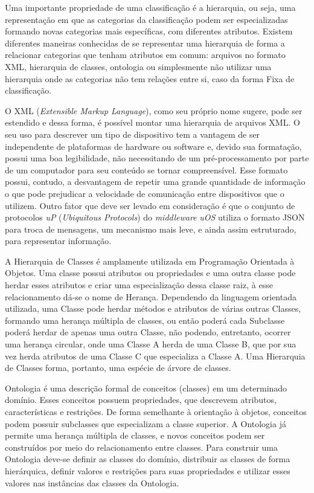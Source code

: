 Uma importante propriedade de uma classificação é a hierarquia, ou seja, uma representação em que as categorias da classificação podem ser especializadas formando novas categorias mais específicas, com diferentes atributos. Existem diferentes maneiras conhecidas de se representar uma hierarquia de forma a relacionar categorias que tenham atributos em comum: arquivos no formato XML, hierarquia de classes, ontologia ou simplesmente não utilizar uma hierarquia onde as categorias não tem relações entre si, caso da forma Fixa de classificação.

O XML (\emph{Extensible Markup Language}), como seu próprio nome sugere, pode ser estendido e dessa forma, é possível montar uma hierarquia de arquivos XML. O seu uso para descrever um tipo de dispositivo tem a vantagem de ser independente de plataformas de hardware ou software e, devido sua formatação, possui uma boa legibilidade, não necessitando de um pré-processamento por parte de um computador para seu conteúdo se tornar compreensível. Esse formato possui, contudo, a desvantagem de repetir uma grande quantidade de informação o que pode prejudicar a velocidade de comunicação entre dispositivos que o utilizem. Outro fator que deve ser levado em consideração é que o conjunto de protocolos \emph{uP} (\emph{Ubiquitous Protocols}) do \emph{middleware} \emph{uOS} utiliza o formato JSON para troca de mensagens, um mecanismo mais leve, e ainda assim estruturado, para representar informação.

A Hierarquia de Classes é amplamente utilizada em Programação Orientada à Objetos. Uma classe possui atributos ou propriedades e uma outra classe pode herdar esses atributos e criar uma especialização dessa classe raiz, à esse relacionamento dá-se o nome de Herança. Dependendo da linguagem orientada utilizada, uma Classe pode herdar métodos e atributos de várias outras Classes, formando uma herança múltipla de classes, ou então poderá cada Subclasse poderá herdar de apenas uma outra Classe, não podendo, entretanto, ocorrer uma herança circular, onde uma Classe A herda de uma Classe B, que por sua vez herda atributos de uma Classe C que especializa a Classe A. Uma Hierarquia de Classes forma, portanto, uma espécie de árvore de classes.

Ontologia é uma descrição formal de conceitos (classes) em um determinado domínio. Esses conceitos possuem propriedades, que descrevem atributos, características e restrições. De forma semelhante à orientação à objetos, conceitos podem possuir subclasses que especializam a classe superior. A Ontologia já permite uma herança múltipla de classes, e novos conceitos podem ser construídos por meio do relacionamento entre classes. Para construir uma Ontologia deve-se definir as classes do domínio, distribuir as classes de forma hierárquica, definir valores e restrições para suas propriedades e utilizar esses valores nas instâncias das classes da Ontologia. 

